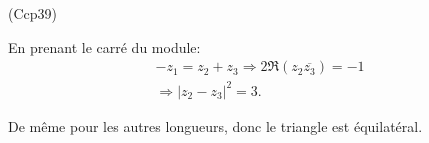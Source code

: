 \begin{tiny}(Ccp39)\end{tiny} En prenant le carré du module:
\begin{multline*}
  -z_1 = z_2 + z_3 \Rightarrow 2 \Re(z_2 \overline{z_3}) = -1\\
  \Rightarrow |z_2 - z_3|^2 = 3.
\end{multline*}

De même pour les autres longueurs, donc le triangle est équilatéral.
